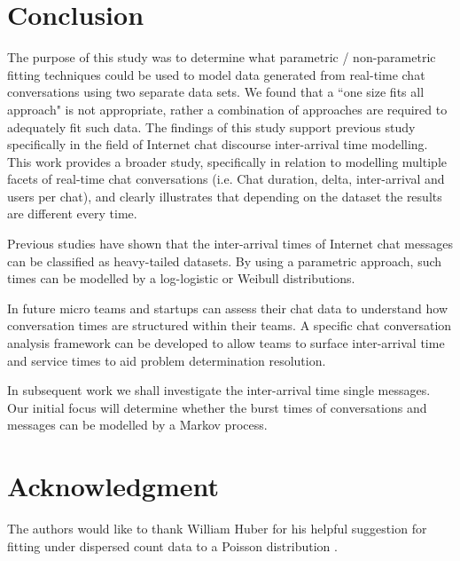\section{Conclusion}
The purpose of this study was to determine what parametric / non-parametric fitting techniques could be used to model data generated from real-time chat conversations using two separate data sets. We found that a ``one size fits all approach" is not appropriate, rather a combination of approaches are required to adequately fit such data. The findings of this study support previous study specifically in the field of Internet chat discourse inter-arrival time modelling. This work provides a broader study, specifically in relation to modelling multiple facets of real-time chat conversations (i.e. Chat duration, delta, inter-arrival and users per chat), and clearly illustrates that depending on the dataset the results are different every time.

Previous studies have shown that the inter-arrival times of Internet chat messages can be classified as heavy-tailed datasets. By using a parametric approach, such times can be modelled by a log-logistic or Weibull distributions. 

In future micro teams and startups can assess their chat data to understand how conversation times are structured within their teams. A specific chat conversation analysis framework can be developed to allow teams to surface inter-arrival time and service times to aid problem determination resolution. 

In subsequent work we shall investigate the inter-arrival time single messages. Our initial focus will determine whether the burst times of conversations and messages can be modelled by a Markov process.


\section*{Acknowledgment}
The authors would like to thank William Huber for his helpful suggestion for fitting under dispersed count data to a Poisson distribution \cite{poissoncount}.


